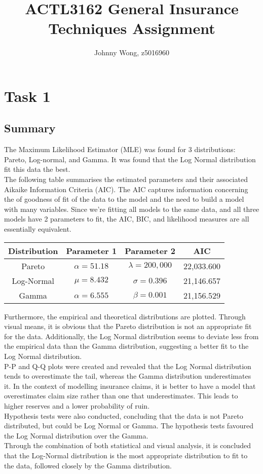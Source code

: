 \documentclass[titlepage]{article}
\title{ACTL3162 General Insurance Techniques Assignment}
\author{Johnny Wong, z5016960}
\begin{document}
	\maketitle
	\tableofcontents
	\newpage
	\section{Task 1}
	\subsection{Summary}
	The Maximum Likelihood Estimator (MLE) was found for 3 distributions: Pareto, Log-normal, and Gamma. It was found that the Log Normal distribution fit this data the best.\\
	
	The following table summarises the estimated parameters and their associated Aikaike Information Criteria (AIC). The AIC captures information concerning the  of goodness of fit of the data to the model and the need to build a model with many variables. Since we're fitting all models to the same data, and all three models have 2 parameters to fit, the AIC, BIC, and likelihood measures are all essentially equivalent.
	
	\begin{center}
		\begin{tabular}{ |c|c|c|c|} 
			\hline
			Distribution & Parameter 1 & Parameter 2 & AIC \\ \hline
			Pareto & $ \alpha = 51.18 $ & $\lambda = 200,000$ & 22,033.600\\ 
			Log-Normal & $\mu = 8.432$ & $\sigma = 0.396$ & 21,146.657 \\ 
			Gamma & $\alpha = 6.555$ & $\beta = 0.001$ & 21,156.529 \\ 
			\hline
		\end{tabular}
	\end{center}

	Furthermore, the empirical and theoretical distributions are plotted. 
	Through visual means, it is obvious that the Pareto distribution is not an appropriate fit for the data. 
	Additionally, the Log Normal distribution seems to deviate less from the empirical data than the Gamma distribution, suggesting a better fit to the Log Normal distribution.\\
	P-P and Q-Q plots were created and revealed that the Log Normal distribution tends to overestimate the tail, whereas the Gamma distribution underestimates it. In the context of modelling insurance claims, it is better to have a model that overestimates claim size rather than one that underestimates. This leads to higher reserves and a lower probability of ruin.
	\\
	Hypothesis tests were also conducted, concluding that the data is not Pareto distributed, but could be Log Normal or Gamma. The hypothesis tests favoured the Log Normal distribution over the Gamma.\\
	Through the combination of both statistical and visual analysis, it is concluded that the Log-Normal distribution is the most appropriate distribution to fit to the data, followed closely by the Gamma distribution.
\end{document}
